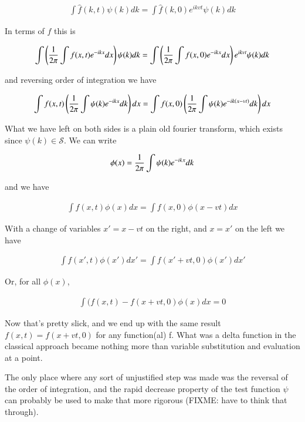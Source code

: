 \documentclass{article}
\newcommand{\Sw}[0]{\mathcal{S}}
\begin{document}
\begin{align*}
\int {\hat{f}}(k,t) \psi(k) dk = \int \hat{f}(k,0) e^{i k v t} \psi(k) dk
\end{align*}

In terms of $f$ this is

\begin{align*}
\int \left( \frac{1}{2\pi} \int f(x,t) e^{-i k x} dx \right) \psi(k) dk = \int \left(\frac{1}{2\pi} \int f(x,0) e^{-i k x} dx \right) e^{i k v t} \psi(k) dk
\end{align*}

and reversing order of integration we have

\begin{align*}
\int f(x,t) \left( \frac{1}{2\pi} \int \psi(k) e^{-i k x} dk \right) dx = \int f(x,0) \left(\frac{1}{2\pi} \int \psi(k) e^{-i k (x - v t)} dk \right) dx
\end{align*}

What we have left on both sides is a plain old fourier transform, which exists since $\psi(k) \in \Sw$. We can write

\begin{align*}
\phi(x) = \frac{1}{2\pi} \int \psi(k) e^{-i k x} dk 
\end{align*}

and we have

\begin{align*}
\int f(x,t) \phi(x) dx = \int f(x,0) \phi(x - vt) dx
\end{align*}

With a change of variables $x' = x - vt$ on the right, and $x = x'$ on the left we have

\begin{align*}
\int f(x',t) \phi(x') dx' = \int f(x' + vt,0) \phi(x') dx'
\end{align*}

Or, for all $\phi(x)$,

\begin{align*}
\int (f(x,t) - f(x + vt, 0) \phi(x) dx = 0
\end{align*}

Now that's pretty slick, and we end up with the same result $f(x,t) = f(x + vt, 0)$ for any function(al) f.
What was a delta function in the classical approach became nothing more than variable substitution and evaluation at a point.

The only place where
any sort of unjustified step was made was the reversal of the order of integration, and the rapid decrease property of the test function $\psi$ can probably be used
to make that more rigorous (FIXME: have to think that through).



\end{document}
